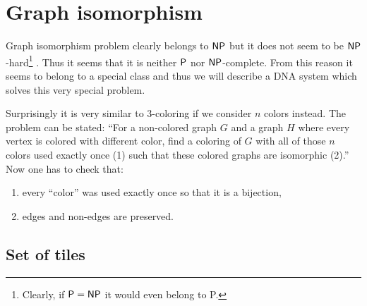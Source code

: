 \section{Graph isomorphism}

Graph isomorphism problem clearly belongs to $\NP$ but it does not seem to be $\NP$-hard\footnote{Clearly, if $\P = \NP$ it would even belong to P.} \cite{borec_z_wiki}. Thus it seems that it is neither $\P$ nor $\NP$-complete. From this reason it seems to belong to a special class and thus we will describe a DNA system which solves this very special problem. %

Surprisingly it is very similar to 3-coloring if we consider $n$ colors instead. The problem can be stated: ``For a non-colored graph $G$ and a graph $H$ where every vertex is colored with different color, find a coloring of $G$ with all of those $n$ colors used exactly once (1) such that these colored graphs are isomorphic (2).'' Now one has to check that:
\begin{enumerate}
	\item every ``color'' was used exactly once so that it is a bijection,
	\item edges and non-edges are preserved.
\end{enumerate}

\subsection*{Set of tiles}

